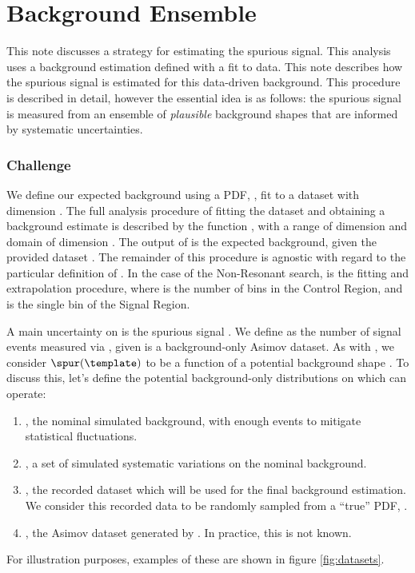 \chapter{Background Ensemble}\label{sec:backgroundEnsamble}

This note discusses a strategy for estimating the spurious signal. This analysis uses a background estimation defined with a fit to data. This note describes how the spurious signal is estimated for this data-driven background.
This procedure is described in detail, however the essential idea is as follows: the spurious signal is measured from an ensemble of \emph{plausible} background shapes that are informed by systematic uncertainties.

\subsection*{Challenge}

We define our expected background using a PDF, \func, fit to a dataset \template with dimension \ddata. The full analysis procedure of fitting the dataset and obtaining a background estimate is described by the function \eeNbkg, with a range of dimension \dbkg and domain of dimension \ddata. The output of \eeNbkg is the expected background, given the provided dataset \template. The remainder of this procedure is agnostic with regard to the particular definition of \eeNbkg. In the case of the Non-Resonant search, \eeNbkg is the fitting and extrapolation procedure, where \ddata is the number of bins in the Control Region, and \dbkg is the single bin of the Signal Region.

A main uncertainty on \eeNbkg is the spurious signal \spur.
We define \spur as the number of signal events measured via \eeNbkg, given \template is a background-only Asimov dataset.
As with \eeNbkg, we consider $\spur(\template)$ to be a function of a potential background shape \template.
To discuss this, let's define the potential background-only distributions on which \eeNbkg can operate:
\begin{enumerate}
    \item \mc, the nominal simulated background, with enough events to mitigate statistical fluctuations.
    \item \syst, a set of simulated systematic variations on the nominal background.
    \item \data, the recorded dataset which will be used for the final background estimation. We consider this recorded data to be randomly sampled from a ``true'' PDF, \truth.
    \item \truthdata, the Asimov dataset generated by \truth. In practice, this is not known.
\end{enumerate}
For illustration purposes, examples of these are shown in figure \ref{fig:datasets}.

